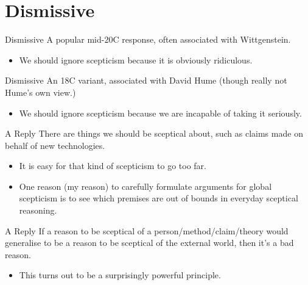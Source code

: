 \documentclass[
  17pt,
  letterpaper,
  ignorenonframetext,
  aspectratio=169,
]{beamer}
\providecommand{\tightlist}{%
  \setlength{\itemsep}{0pt}\setlength{\parskip}{0pt}}\usepackage{longtable,booktabs,array}
\begin{document}
\hypertarget{dismissive}{%
\section{Dismissive}\label{dismissive}}

\begin{frame}{Dismissive}
\protect\hypertarget{dismissive-1}{}
A popular mid-20C response, often associated with Wittgenstein.

\begin{itemize}[<+->]
\tightlist
\item
  We should ignore scepticism because it is obviously ridiculous.
\end{itemize}
\end{frame}

\begin{frame}{Dismissive}
\protect\hypertarget{dismissive-2}{}
An 18C variant, associated with David Hume (though really not Hume's own
view.)

\begin{itemize}[<+->]
\tightlist
\item
  We should ignore scepticism because we are incapable of taking it
  seriously.
\end{itemize}
\end{frame}

\begin{frame}{A Reply}
\protect\hypertarget{a-reply}{}
There are things we should be sceptical about, such as claims made on
behalf of new technologies.

\begin{itemize}[<+->]
\tightlist
\item
  It is easy for that kind of scepticism to go too far.
\item
  One reason (my reason) to carefully formulate arguments for global
  scepticism is to see which premises are out of bounds in everyday
  sceptical reasoning.
\end{itemize}
\end{frame}

\begin{frame}{A Reply}
\protect\hypertarget{a-reply-1}{}
If a reason to be sceptical of a person/method/claim/theory would
generalise to be a reason to be sceptical of the external world, then
it's a bad reason.

\begin{itemize}[<+->]
\tightlist
\item
  This turns out to be a surprisingly powerful principle.
\end{itemize}
\end{frame}
\end{document}
